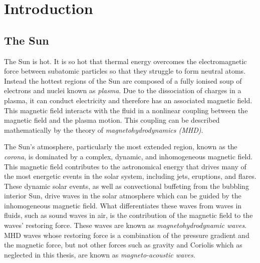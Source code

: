 
\chapter{Introduction}
\label{chap:intro}

\section{The Sun}
\label{sec: sun}

The Sun is hot. It is so hot that thermal energy overcomes the electromagnetic force between subatomic particles so that they struggle to form neutral atoms. Instead the hottest regions of the Sun are composed of a fully ionised soup of electrons and nuclei known as \textit{plasma}. Due to the dissociation of charges in a plasma, it can conduct electricity and therefore has an associated magnetic field. This magnetic field interacts with the fluid in a nonlinear coupling between the magnetic field and the plasma motion. This coupling can be described mathematically by the theory of \textit{magnetohydrodynamics (MHD)}.

The Sun's atmosphere, particularly the most extended region, known as the \textit{corona}, is dominated by a complex, dynamic, and inhomogeneous magnetic field. This magnetic field contributes to the astronomical energy that drives many of the most energetic events in the solar system, including jets, eruptions, and flares. These dynamic solar events, as well as convectional buffeting from the bubbling interior Sun, drive waves in the solar atmosphere which can be guided by the inhomogeneous magnetic field. What differentiates these waves from waves in fluids, such as sound waves in air, is the contribution of the magnetic field to the waves' restoring force. These waves are known as \textit{magnetohydrodynamic waves}. MHD waves whose restoring force is a combination of the pressure gradient and the magnetic force, but not other forces such as gravity and Coriolis which as neglected in this thesis, are known as \textit{magneto-acoustic waves}.

